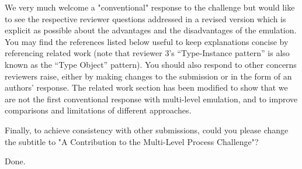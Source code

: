 \documentclass[10pt]{article}
\begin{document}
\begin{response}{We very much welcome a "conventional" response to the challenge but would like to see the respective reviewer questions addressed in a revised version which is explicit as possible about the advantages and the disadvantages of the emulation. You may find the references listed below useful to keep explanations concise by referencing related work (note that reviewer 3’s “Type-Instance pattern” is also known as the “Type Object” pattern). You should also respond to other concerns reviewers raise, either by making changes to the submission or in the form of an authors' response.} 
The related work section has been modified to show that we are not the first conventional response with multi-level emulation, and to improve comparisons and limitations of different approaches.
\end{response}


\begin{response}{Finally, to achieve consistency with other submissions, could you please change the subtitle to "A Contribution to the Multi-Level Process Challenge"?}

Done.
\end{response}

\pagebreak
\end{document}
